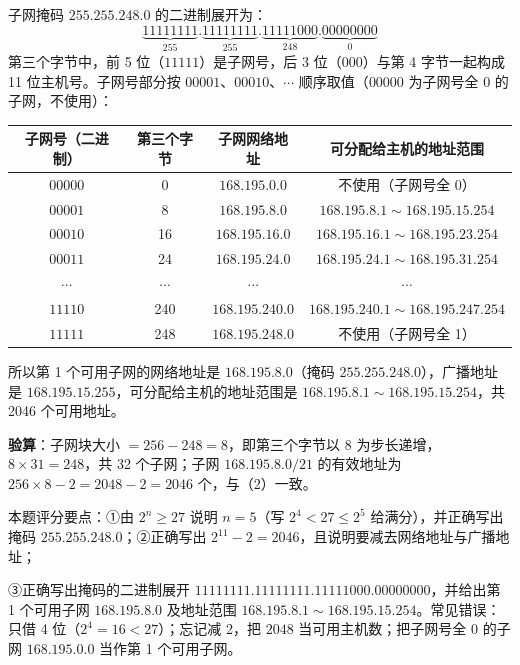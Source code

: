 \documentclass[a4paper,11pt]{article}
\begin{document}
子网掩码 \(255.255.248.0\) 的二进制展开为：
\[
\underbrace{11111111}_{255}.\underbrace{11111111}_{255}.\underbrace{11111000}_{248}.\underbrace{00000000}_{0}
\]
第三个字节中，前 5 位（\(11111\)）是子网号，后 3 位（\(000\)）与第 4 字节一起构成 11 位主机号。子网号部分按 \(00001\)、\(00010\)、\(\cdots\) 顺序取值（\(00000\) 为子网号全 0 的子网，不使用）：

\begin{center}
\begin{tabular}{cccc}
\toprule
子网号（二进制） & 第三个字节 & 子网网络地址 & 可分配给主机的地址范围 \\
\midrule
\(00000\) & 0 & \(168.195.0.0\) & 不使用（子网号全 0） \\
\(00001\) & 8 & \(168.195.8.0\) & \(168.195.8.1\sim168.195.15.254\) \\
\(00010\) & 16 & \(168.195.16.0\) & \(168.195.16.1\sim168.195.23.254\) \\
\(00011\) & 24 & \(168.195.24.0\) & \(168.195.24.1\sim168.195.31.254\) \\
\(\cdots\) & \(\cdots\) & \(\cdots\) & \(\cdots\) \\
\(11110\) & 240 & \(168.195.240.0\) & \(168.195.240.1\sim168.195.247.254\) \\
\(11111\) & 248 & \(168.195.248.0\) & 不使用（子网号全 1） \\
\bottomrule
\end{tabular}
\end{center}

所以第 1 个可用子网的网络地址是 \(\mathbf{168.195.8.0}\)（掩码 \(255.255.248.0\)），广播地址是 \(168.195.15.255\)，可分配给主机的地址范围是 \(\mathbf{168.195.8.1\sim168.195.15.254}\)，共 2046 个可用地址。

\textbf{验算}：子网块大小 \(=256-248=8\)，即第三个字节以 8 为步长递增，\(8\times 31=248\)，共 32 个子网；子网 \(168.195.8.0/21\) 的有效地址为 \(256\times 8-2=2048-2=2046\) 个，与（2）一致。

\begin{analysis}
本题评分要点：①由 \(2^n\ge 27\) 说明 \(n=5\)（写 \(2^4<27\le 2^5\) 给满分），并正确写出掩码 \(255.255.248.0\)；②正确写出 \(2^{11}-2=2046\)，且说明要减去网络地址与广播地址；\par ③正确写出掩码的二进制展开 \(11111111.11111111.11111000.00000000\)\allowbreak，并给出第 1 个可用子网 \(168.195.8.0\) 及地址范围 \(168.195.8.1\sim168.195.15.254\)。常见错误：只借 4 位（\(2^4=16<27\)）；忘记减 2，把 \(2048\) 当可用主机数；把子网号全 0 的子网 \(168.195.0.0\) 当作第 1 个可用子网。
\end{analysis}
\end{document}
